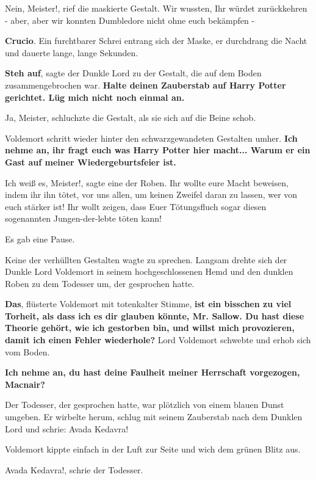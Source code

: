 \glqq{}Nein, Meister!\grqq{}, rief die maskierte Gestalt. \glqq{}Wir wussten, Ihr
würdet zurückkehren - aber, aber wir konnten Dumbledore nicht ohne euch
bekämpfen -\grqq{}

\glqq{}\textbf{Crucio}.\grqq{} Ein furchtbarer Schrei entrang sich der Maske, er
durchdrang die Nacht und dauerte lange, lange Sekunden.

\glqq{}\textbf{Steh auf}\grqq{}, sagte der Dunkle Lord zu der Gestalt, die auf
dem Boden zusammengebrochen war. \glqq{}\textbf{Halte deinen Zauberstab auf Harry
Potter gerichtet. Lüg mich nicht noch einmal an.}\grqq{}

\glqq{}Ja, Meister\grqq{}, schluchzte die Gestalt, als sie sich auf die Beine
schob.

Voldemort schritt wieder hinter den schwarzgewandeten Gestalten umher. \glqq{}
\textbf{Ich nehme an, ihr fragt euch was Harry Potter hier macht... Warum er ein
Gast auf meiner Wiedergeburtsfeier ist.}\grqq{}

\glqq{}Ich weiß es, Meister!\grqq{}, sagte eine der Roben. \glqq{}Ihr wollte eure
Macht beweisen, indem ihr ihn tötet, vor uns allen, um keinen Zweifel daran zu
lassen, wer von euch stärker ist! Ihr wollt zeigen, dass Euer Tötungsfluch sogar
diesen sogenannten Jungen-der-lebte töten kann!\grqq{}

Es gab eine Pause.

Keine der verhüllten Gestalten wagte zu sprechen. Langsam drehte sich der Dunkle
Lord Voldemort in seinem hochgeschlossenen Hemd und den dunklen Roben zu dem
Todesser um, der gesprochen hatte.

\glqq{}\textbf{Das}\grqq{}, flüsterte Voldemort mit totenkalter Stimme, \glqq{}
\textbf{ist ein bisschen zu viel Torheit, als dass ich es dir glauben könnte,
Mr. Sallow. Du hast diese Theorie gehört, wie ich gestorben bin, und willst mich
provozieren, damit ich einen Fehler wiederhole?}\grqq{} Lord Voldemort schwebte und
erhob sich vom Boden.

\glqq{}\textbf{Ich nehme an, du hast deine Faulheit meiner Herrschaft vorgezogen,
Macnair?}\grqq{}

Der Todesser, der gesprochen hatte, war plötzlich von einem blauen Dunst
umgeben. Er wirbelte herum, schlug mit seinem Zauberstab nach dem Dunklen Lord
und schrie: \glqq{}Avada Kedavra!\grqq{}

Voldemort kippte einfach in der Luft zur Seite und wich dem grünen Blitz aus.

\glqq{}Avada Kedavra!\grqq{}, schrie der Todesser.

